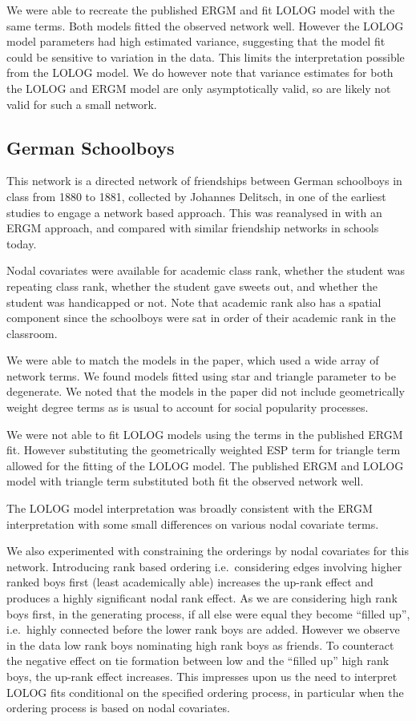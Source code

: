 \documentclass[
]{statsoc}
\begin{document}
We were able to recreate the published ERGM and fit LOLOG model with the
same terms. Both models fitted the observed network well. However the
LOLOG model parameters had high estimated variance, suggesting that the
model fit could be sensitive to variation in the data. This limits the
interpretation possible from the LOLOG model. We do however note that
variance estimates for both the LOLOG and ERGM model are only
asymptotically valid, so are likely not valid for such a small network.

\subsection{German Schoolboys}

This network is a directed network of friendships between German
schoolboys in class from 1880 to 1881, collected by Johannes Delitsch,
in one of the earliest studies to engage a network based approach. This
was reanalysed in \cite{Heidler2014} with an ERGM approach, and compared
with similar friendship networks in schools today.

Nodal covariates were available for academic class rank, whether the
student was repeating class rank, whether the student gave sweets out,
and whether the student was handicapped or not. Note that academic rank
also has a spatial component since the schoolboys were sat in order of
their academic rank in the classroom.

We were able to match the models in the paper, which used a wide array
of network terms. We found models fitted using star and triangle
parameter to be degenerate. We noted that the models in the paper did
not include geometrically weight degree terms as is usual to account for
social popularity processes.

We were not able to fit LOLOG models using the terms in the published
ERGM fit. However substituting the geometrically weighted ESP term for
triangle term allowed for the fitting of the LOLOG model. The published
ERGM and LOLOG model with triangle term substituted both fit the
observed network well.

The LOLOG model interpretation was broadly consistent with the ERGM
interpretation with some small differences on various nodal covariate
terms.

We also experimented with constraining the orderings by nodal covariates
for this network. Introducing rank based ordering i.e.~considering edges
involving higher ranked boys first (least academically able) increases
the up-rank effect and produces a highly significant nodal rank effect.
As we are considering high rank boys first, in the generating process,
if all else were equal they become ``filled up'', i.e.~highly connected
before the lower rank boys are added. However we observe in the data low
rank boys nominating high rank boys as friends. To counteract the
negative effect on tie formation between low and the ``filled up'' high
rank boys, the up-rank effect increases. This impresses upon us the need
to interpret LOLOG fits conditional on the specified ordering process,
in particular when the ordering process is based on nodal covariates.
\end{document}
